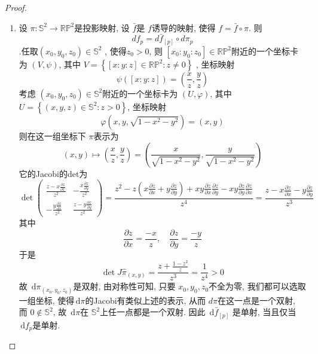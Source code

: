 \documentclass[../main.tex]{subfiles}
\begin{document}
\begin{proof}
  \begin{enumerate}
    \item    设 \(   \pi : \mathbb{S}^{2}\to \mathbb{RP}^{2}  \)是投影映射, 设 \( \bar{f}  \)是 \(  f  \)诱导的映射, 使得 \( f= \bar{f}\circ \pi  \). 则 \[
    d f_{p}=  d \bar{f}_{[p]}\circ d  \pi _{p}
    \]   .任取\(  \left( x_0,y_0,z_0 \right)\in \mathbb{S}^{2}   \)  , 使得\(  z_0> 0  \), 则 \(  [x_0:y_0:z_0]\in \mathbb{RP}^{2}  \)附近的一个坐标卡为 \(  \left( V,\psi  \right)   \), 其中 \(  V  = \left\{ [x:y:z]\in \mathbb{RP}^{2}: z\neq 0 \right\}\)  , 坐标映射    \[
   \psi \left( [x:y:z] \right)=  \left( \frac{x }{z }, \frac{y }{z }   \right)  
   \]考虑 \(\left( x_0,y_0,z_0 \right)\in    \mathbb{S}^{2}  \)附近的一个坐标卡为 \(  \left( U,  \varphi  \right)   \), 其中 \(  U= \left\{ \left( x,y,z \right)\in \mathbb{S}^{2}: z> 0  \right\}  \), 坐标映射  \[
    \varphi \left( x,y, \sqrt{1-x^{2}-y^{2}} \right)= \left( x,y \right) 
   \] 则在这一组坐标下 \(   \pi   \)表示为 \[
    \left( x,y\right)\mapsto \left( \frac{x }{z },\frac{y }{z }   \right)=   \left( \frac{x }{\sqrt{1-x^{2}-y^{2}}}, \frac{y }{\sqrt{1-x^{2}-y^{2}} }   \right)  
   \] 它的Jacobi的det为 \[
 \det  \begin{pmatrix} 
         \frac{z-x\frac{\partial z}{\partial x} }{z^{2} }& -\frac{x\frac{\partial z}{\partial y} }{z^{2} }\\ 
          -\frac{y\frac{\partial z}{\partial x} }{z^{2} }& \frac{z-y\frac{\partial z}{\partial y} }{z^{2} }    
   \end{pmatrix} = \frac{z^{2}-z\left( x\frac{\partial z}{\partial x}+ y\frac{\partial z}{\partial y} \right)+ xy\frac{\partial z}{\partial x}\frac{\partial z}{\partial y}  -xy\frac{\partial z}{\partial y}\frac{\partial z}{\partial x}}{z^{4} } = \frac{z- x\frac{\partial z}{\partial x}-y\frac{\partial z}{\partial y} }{z^{3} } 
   \]其中\[
   \frac{\partial z}{\partial x}= \frac{-x }{z },\quad \frac{\partial z}{\partial y}= \frac{-y }{z }  
   \]于是 \[
   \det J \hat{ \pi } _{\left( x,y \right) }= \frac{z+  \frac{1-z^{2} }{z }  }{ z^{3}}= \frac{1 }{z^{4} }> 0  
   \]故 \(  \,\mathrm{d}  \pi _{\left( x_0,y_0,z_0 \right) }  \)是双射, 由对称性可知, 只要 \(  x_0,y_0,z_0  \)不全为零, 我们都可以选取一组坐标, 使得\(  \,\mathrm{d}  \pi   \)的Jacobi有类似上述的表示, 从而 \(  d \pi   \)在这一点是一个双射, 而 \(  0\not \in   \mathbb{S}^{2}\), 故 \(  \,\mathrm{d}  \pi   \)在 \(  \mathbb{S}^{2}  \)上任一点都是一个双射. 因此 \(  \,\mathrm{d} \bar{f}_{[p]}  \) 是单射, 当且仅当 \(  \,\mathrm{d} f_{p}  \)是单射. 

\end{enumerate}
\end{proof}
\end{document}
